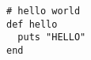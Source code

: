 \documentclass{jlreq}
\begin{document}
\begin{tcolorbox}
\begin{verbatim}
# hello world
def hello
  puts "HELLO"
end
\end{verbatim}
\end{tcolorbox}
\end{document}
